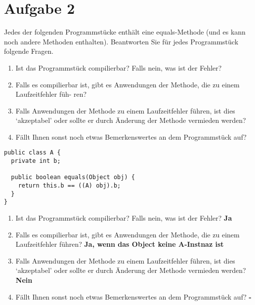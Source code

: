 \section{Aufgabe 2}
Jedes der folgenden Programmstücke enthält eine equals-Methode (und es kann
noch andere Methoden enthalten). Beantworten Sie für jedes Programmstück
folgende Fragen.

\begin{enumerate}
    \item Ist das Programmstück compilierbar? Falls nein, was ist der Fehler?
    \item Falls es compilierbar ist, gibt es Anwendungen der Methode, die zu einem
          Laufzeitfehler füh- ren?
    \item Falls Anwendungen der Methode zu einem Laufzeitfehler führen, ist dies
          `akzeptabel' oder sollte er durch Änderung der Methode vermieden werden?
    \item Fällt Ihnen sonst noch etwas Bemerkenswertes an dem Programmstück auf?
\end{enumerate}

\begin{lstlisting}
public class A {
  private int b;

  public boolean equals(Object obj) {
    return this.b == ((A) obj).b;
  }
}
\end{lstlisting}
\begin{enumerate}
    \item Ist das Programmstück compilierbar? Falls nein, was ist der Fehler? \newline
          \textbf{Ja}
    \item Falls es compilierbar ist, gibt es Anwendungen der Methode, die zu einem
          Laufzeitfehler führen? \newline \textbf{Ja, wenn das Object keine A-Instnaz
              ist}
    \item Falls Anwendungen der Methode zu einem Laufzeitfehler führen, ist dies
          `akzeptabel' oder sollte er durch Änderung der Methode vermieden
          werden?\newline \textbf{Nein}
    \item Fällt Ihnen sonst noch etwas Bemerkenswertes an dem Programmstück auf?\newline
          \textbf{-}
\end{enumerate}

